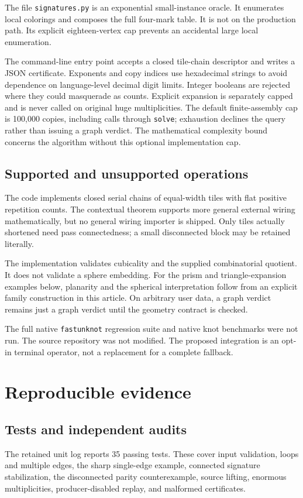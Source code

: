 \documentclass[11pt]{article}
\theoremstyle{remark}\newtheorem{remark}[theorem]{Remark}
\DeclareRobustCommand{\code}[1]{\nolinkurl{#1}}
\begin{document}
The file \code{signatures.py} is an exponential small-instance oracle. It enumerates local colorings and composes the full four-mark table. It is not on the production path. Its explicit eighteen-vertex cap prevents an accidental large local enumeration.

The command-line entry point accepts a closed tile-chain descriptor and writes a JSON certificate. Exponents and copy indices use hexadecimal strings to avoid dependence on language-level decimal digit limits. Integer booleans are rejected where they could masquerade as counts. Explicit expansion is separately capped and is never called on original huge multiplicities. The default finite-assembly cap is 100,000 copies, including calls through \code{solve}; exhaustion declines the query rather than issuing a graph verdict. The mathematical complexity bound concerns the algorithm without this optional implementation cap.

\subsection{Supported and unsupported operations}
The code implements closed serial chains of equal-width tiles with flat positive repetition counts. The contextual theorem supports more general external wiring mathematically, but no general wiring importer is shipped. Only tiles actually shortened need pass connectedness; a small disconnected block may be retained literally.

The implementation validates cubicality and the supplied combinatorial quotient. It does not validate a sphere embedding. For the prism and triangle-expansion examples below, planarity and the spherical interpretation follow from an explicit family construction in this article. On arbitrary user data, a graph verdict remains just a graph verdict until the geometry contract is checked.

The full native \code{fastunknot} regression suite and native knot benchmarks were not run. The source repository was not modified. The proposed integration is an opt-in terminal operator, not a replacement for a complete fallback.

\section{Reproducible evidence}
\subsection{Tests and independent audits}
The retained unit log reports 35 passing tests. These cover input validation, loops and multiple edges, the sharp single-edge example, connected signature stabilization, the disconnected parity counterexample, source lifting, enormous multiplicities, producer-disabled replay, and malformed certificates.
\end{document}

